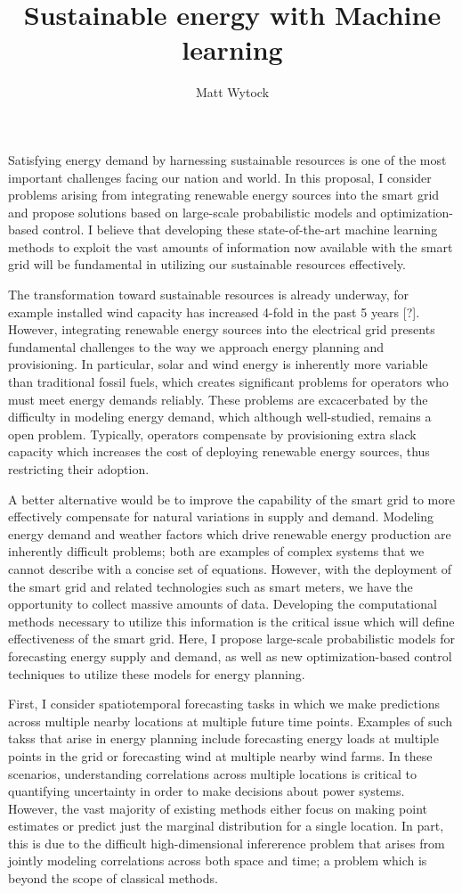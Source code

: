 \documentclass[12pt]{article}
\title{Sustainable energy with Machine learning}
\author{Matt Wytock}
\begin{document}
Satisfying energy demand by harnessing sustainable resources is one of the most important challenges facing our nation and world. In this proposal, I consider problems arising from integrating renewable energy sources into the smart grid and propose solutions based on large-scale probabilistic models and optimization-based control. I believe that developing these state-of-the-art machine learning methods to exploit the vast amounts of information now available with the smart grid will be fundamental in utilizing our sustainable resources effectively.

The transformation toward sustainable resources is already underway, for example installed wind capacity has increased 4-fold in the past 5 years [?]. However, integrating renewable energy sources into the electrical grid presents fundamental challenges to the way we approach energy planning and provisioning. In particular, solar and wind energy is inherently more variable than traditional fossil fuels, which creates significant problems for operators who must meet energy demands reliably. These  problems are excacerbated by the difficulty in modeling energy demand, which although well-studied, remains a open problem. Typically, operators compensate by provisioning extra slack capacity which increases the cost of deploying renewable energy sources, thus restricting their adoption.

A better alternative would be to improve the capability of the smart grid to more effectively compensate for natural variations in supply and demand. Modeling energy demand and weather factors which drive renewable energy production are inherently difficult problems; both are examples of complex systems that we cannot describe with a concise set of equations. However, with the deployment of the smart grid and related technologies such as smart meters, we have the opportunity to collect massive amounts of data. Developing the computational methods necessary to utilize this information is the critical issue which will define effectiveness of the smart grid. Here, I propose large-scale probabilistic models for forecasting energy supply and demand, as well as new optimization-based control techniques to utilize these models for energy planning.

First, I consider spatiotemporal forecasting tasks in which we make predictions across multiple nearby locations at multiple future time points. Examples of such takss that arise in energy planning include forecasting energy loads at multiple points in the grid or forecasting wind at multiple nearby wind farms. In these scenarios, understanding correlations across multiple locations is critical to quantifying uncertainty in order to make decisions about power systems. However, the vast majority of existing methods either focus on making point estimates or predict just the marginal distribution for a single location. In part, this is due to the difficult high-dimensional infererence problem that arises from jointly modeling correlations across both space and time; a problem which is beyond the scope of classical methods.
\end{document}
